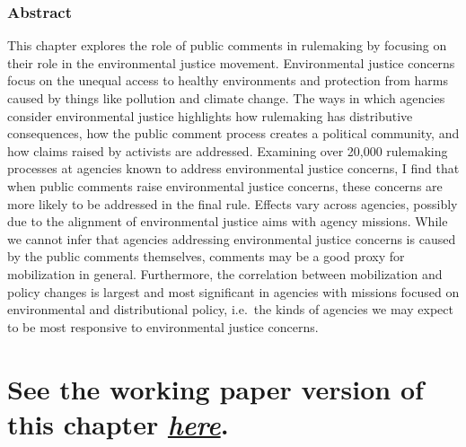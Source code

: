 \documentclass[
]{book}
\begin{document}
\hypertarget{abstract-4}{%
\subsubsection*{Abstract}\label{abstract-4}}

This chapter explores the role of public comments in rulemaking by focusing on their role in the environmental justice movement. Environmental justice concerns focus on the unequal access to healthy environments and protection from harms caused by things like pollution and climate change. The ways in which agencies consider environmental justice highlights how rulemaking has distributive consequences, how the public comment process creates a political community, and how claims raised by activists are addressed. Examining over 20,000 rulemaking processes at agencies known to address environmental justice concerns, I find that when public comments raise environmental justice concerns, these concerns are more likely to be addressed in the final rule. Effects vary across agencies, possibly due to the alignment of environmental justice aims with agency missions. While we cannot infer that agencies addressing environmental justice concerns is caused by the public comments themselves, comments may be a good proxy for mobilization in general. Furthermore, the correlation between mobilization and policy changes is largest and most significant in agencies with missions focused on environmental and distributional policy, i.e.~the kinds of agencies we may expect to be most responsive to environmental justice concerns.

\hypertarget{see-the-working-paper-version-of-this-chapter-here.-2}{%
\section{\texorpdfstring{See the working paper version of this chapter \href{https://judgelord.github.io/research/ej/}{\emph{here}}.}{See the working paper version of this chapter here.}}\label{see-the-working-paper-version-of-this-chapter-here.-2}}

  
\end{document}
